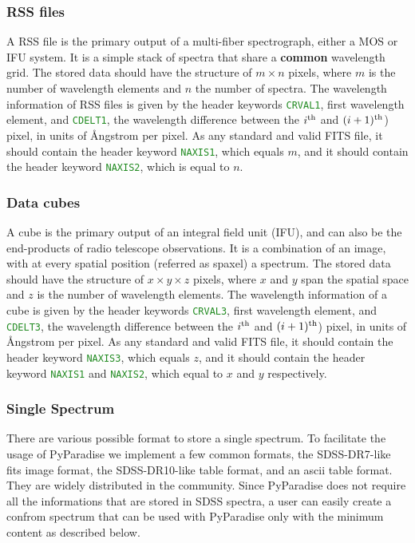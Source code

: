 \documentclass[usenatbib,usegraphicx,useAMS,onecolumn]{mn2e}
\newcommand{\codeline}[1]{\lstinline|#1|}
\newcommand{\headerkw}[1]{\textcolor{ForestGreen}{\codeline{#1}}}
\begin{document}
\subsubsection{RSS files}
\label{subsec:data_rss}
A RSS file is the primary output of a multi-fiber spectrograph, either a MOS or IFU system.
It is a simple stack of spectra that share a \textbf{common} wavelength grid.
The stored data should have the structure of $m \times n$ pixels, where $m$ is the number of wavelength elements and $n$ the number of spectra.
The wavelength information of RSS files is given by the header keywords \headerkw{CRVAL1}, first wavelength element, and \headerkw{CDELT1}, the wavelength difference between the $i^{\rm th}$ and $(i+1)^{\rm th}$) pixel, in units of \r{A}ngstrom per pixel.
As any standard and valid FITS file, it should contain the header keyword \headerkw{NAXIS1}, which equals $m$, and it should contain the header keyword \headerkw{NAXIS2}, which is equal to $n$.

\subsubsection{Data cubes}
\label{subsec:data_cube}
A cube is the primary output of an integral field unit (IFU), and can also be the end-products of radio telescope observations.
It is a combination of an image, with at every spatial position (referred as spaxel) a spectrum.
The stored data should have the structure of $x \times y \times z$ pixels, where $x$ and $y$ span the spatial space and $z$ is the number of wavelength elements.
The wavelength information of a cube is given by the header keywords \headerkw{CRVAL3}, first wavelength element, and \headerkw{CDELT3}, the wavelength difference between the $i^{\rm th}$ and $(i+1)^{\rm th}$) pixel, in units of \r{A}ngstrom per pixel.
As any standard and valid FITS file, it should contain the header keyword \headerkw{NAXIS3}, which equals $z$, and it should contain the header keyword \headerkw{NAXIS1} and \headerkw{NAXIS2}, which equal to $x$ and $y$ respectively.

\subsubsection{Single Spectrum}
\label{subsec:data_single}
There are various possible format to store a single spectrum.
To facilitate the usage of PyParadise we implement a few common formats, the SDSS-DR7-like fits image format, the SDSS-DR10-like table format, and an ascii table format.
They are widely distributed in the community.
Since PyParadise does not require all the informations that are stored in SDSS spectra, a user can easily create a confrom spectrum that can be used with PyParadise only with the minimum content as described below.
\end{document}
